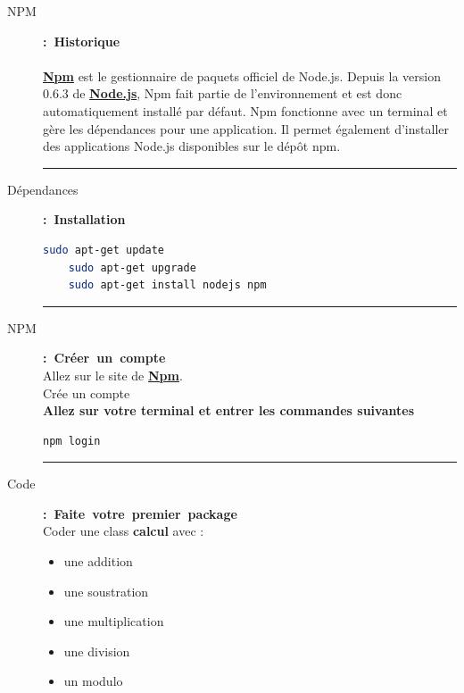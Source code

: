 \documentclass{article}
\begin{document}
    \begin{description}
        \item [NPM] \mbox{\textbf{: Historique}} \\\\ \textbf{\href{https://www.npmjs.com/}{Npm}} est le gestionnaire de paquets officiel de Node.js. Depuis la version 0.6.3 de \textbf{\href{https://nodejs.org/en/}{Node.js}}, Npm fait partie de l'environnement et est donc automatiquement installé par défaut. Npm fonctionne avec un terminal et gère les dépendances pour une application. Il permet également d'installer des applications Node.js disponibles sur le dépôt npm.
        \\
        \begin{center} 
            \rule{0.75\linewidth}{1pt}
        \end{center}
        \item [Dépendances] \mbox{\textbf{: Installation}} 
\begin{lstlisting}[language=sh]
    sudo apt-get update
    sudo apt-get upgrade
    sudo apt-get install nodejs npm
\end{lstlisting}
        \begin{center} 
            \rule{0.75\linewidth}{1pt}
        \end{center}
        \item [NPM] \mbox{\textbf{: Créer un compte}} \\ Allez sur le site de \textbf{\href{https://www.npmjs.com/}{Npm}}. \\ Crée un compte \\ \textbf{Allez sur votre terminal et entrer les commandes suivantes}
\begin{lstlisting}[language=sh]
    npm login 
\end{lstlisting}
        \begin{center} 
            \rule{0.75\linewidth}{1pt}
        \end{center}
        \item [Code] \mbox{\textbf{: Faite votre premier package}} \\ Coder une class \textbf{calcul} avec :
        \begin{itemize}
            \item une addition 
            \item une soustration 
            \item une multiplication 
            \item une division 
            \item un modulo

\end{itemize}
\end{description}
\end{document}
